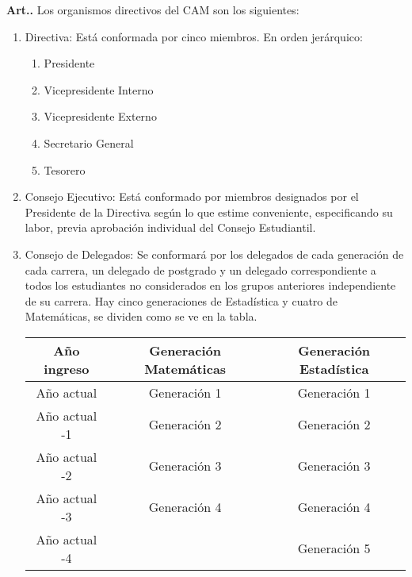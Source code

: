 \documentclass[letterpaper,11pt]{article}
\newcounter{art}
\newenvironment{art}{\refstepcounter{art}\textbf{Art.{\space}\theart.}}{}
\begin{document}
\begin{art}\label{normasGenerales}
    Los organismos directivos del CAM son los siguientes:
    \begin{enumerate}
        \item Directiva: Está conformada por cinco miembros. En orden jerárquico:
              \begin{enumerate}
                  \item Presidente
                  \item Vicepresidente Interno
                  \item Vicepresidente Externo
                  \item Secretario General
                  \item Tesorero
              \end{enumerate}
        \item Consejo Ejecutivo: Está conformado por miembros designados por el Presidente de la Directiva según lo que estime conveniente, especificando su labor, previa aprobación individual del Consejo Estudiantil.
        \item Consejo de Delegados: Se conformará por los delegados de cada generación de cada carrera, un delegado de postgrado y un delegado correspondiente a todos los estudiantes no considerados en los grupos anteriores independiente de su carrera. Hay cinco generaciones de Estadística y cuatro de Matemáticas, se dividen como se ve en la tabla.
              \begin{center}
                  \begin{tabular}{|c|c|c|}
                      \hline
                      Año ingreso   & Generación Matemáticas & Generación Estadística \\
                      \hline
                      Año actual    & Generación 1           & Generación 1           \\
                      Año actual -1 & Generación 2           & Generación 2           \\
                      Año actual -2 & Generación 3           & Generación 3           \\
                      Año actual -3 & Generación 4           & Generación 4           \\
                      Año actual -4 &                        & Generación 5           \\
                      \hline
                  \end{tabular}
              \end{center}

\end{enumerate}
\end{art}
\end{document}

